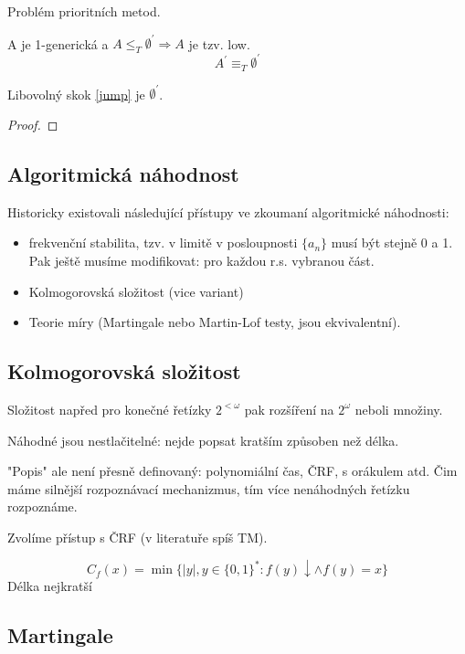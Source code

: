 \begin{note}
	Problém prioritních metod.
\end{note}

\begin{theorem}[Low]
	A je 1-generická a $A \leq_T \emptyset^{\prime} \Rightarrow A$ je tzv. low.
	\[ A^{\prime} \equiv_T \emptyset^{\prime} \]

	Libovolný skok \cref{jump} je $\emptyset^{\prime}$.
\end{theorem}
\begin{proof}
\end{proof}

\subsection{Algoritmická náhodnost}

Historicky existovali následující přístupy ve zkoumaní algoritmické náhodnosti:
\begin{itemize}
	\item frekvenční stabilita, tzv. v limitě v posloupnosti $\{ a_n \}$ musí být stejně 0 a 1.
		Pak ještě musíme modifikovat: pro každou r.s. vybranou část.
	\item Kolmogorovská složitost (vice variant)
	\item Teorie míry (Martingale nebo Martin-Lof testy, jsou ekvivalentní).
\end{itemize}

\subsection{Kolmogorovská složitost}

Složitost napřed pro konečné řetízky $2^{< \omega}$ pak rozšíření na $2^{\omega}$ neboli množiny.
\begin{note}
	Náhodné jsou nestlačitelné: nejde popsat kratším způsoben než délka.

	"Popis" ale není přesně definovaný: polynomiální čas, ČRF, s orákulem atd.
	Čim máme silnější rozpoznávací mechanizmus, tím více nenáhodných řetízku rozpoznáme.
\end{note}

Zvolíme přístup s ČRF (v literatuře spíš TM).

\begin{definition}
	\[ C_f(x) = \min \{ |y|, y \in \{ 0, 1 \}^{\ast}: f(y) \downarrow \land f(y) = x \} \]
	Délka nejkratší
\end{definition}

\subsection{Martingale}

